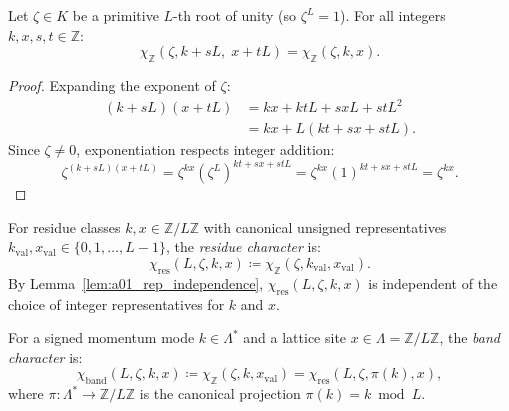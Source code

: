 \begin{lemma}
\label{lem:a01_rep_independence}
Let $\zeta \in K$ be a primitive $L$-th root of unity (so $\zeta^L = 1$). For all integers $k, x, s, t \in \mathbb{Z}$:
\begin{equation}
\chi_{\mathbb{Z}}(\zeta, k + s L, \; x + t L) = \chi_{\mathbb{Z}}(\zeta, k, x).
\end{equation}
\end{lemma}

\begin{proof}
Expanding the exponent of $\zeta$:
\begin{align*}
(k + s L)(x + t L) &= k x + k t L + s x L + s t L^2 \\
&= k x + L (k t + s x + s t L).
\end{align*}
Since $\zeta \neq 0$, exponentiation respects integer addition:
\[
\zeta^{(k + s L)(x + t L)} = \zeta^{k x} \left(\zeta^L\right)^{k t + s x + s t L} = \zeta^{k x} (1)^{k t + s x + s t L} = \zeta^{k x}.
\]
\end{proof}

\begin{definition}
For residue classes $k, x \in \mathbb{Z}/L\mathbb{Z}$ with canonical unsigned representatives $k_{\mathrm{val}}, x_{\mathrm{val}} \in \{0, 1, \dots, L-1\}$, the \emph{residue character} is:
\begin{equation}
\chi_{\mathrm{res}}(L, \zeta, k, x) \coloneqq \chi_{\mathbb{Z}}(\zeta, k_{\mathrm{val}}, x_{\mathrm{val}}).
\end{equation}
By Lemma~\ref{lem:a01_rep_independence}, $\chi_{\mathrm{res}}(L, \zeta, k, x)$ is independent of the choice of integer representatives for $k$ and $x$.
\end{definition}

\begin{definition}
For a signed momentum mode $k \in \Lambda^*$ and a lattice site $x \in \Lambda = \mathbb{Z}/L\mathbb{Z}$, the \emph{band character} is:
\begin{equation}
\chi_{\mathrm{band}}(L, \zeta, k, x) \coloneqq \chi_{\mathbb{Z}}(\zeta, k, x_{\mathrm{val}}) = \chi_{\mathrm{res}}(L, \zeta, \pi(k), x),
\end{equation}
where $\pi: \Lambda^* \to \mathbb{Z}/L\mathbb{Z}$ is the canonical projection $\pi(k) = k \bmod L$.
\end{definition}

